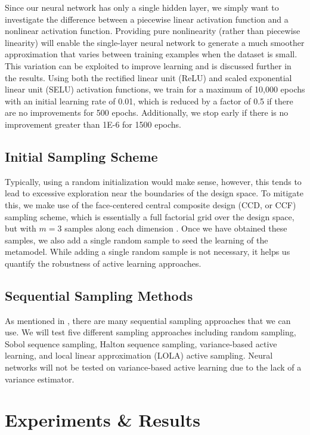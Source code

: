 \documentclass[conference,final]{IEEEtran}
\begin{document}
	Since our neural network has only a single hidden layer, we simply want to investigate the difference between a piecewise linear activation function and a nonlinear activation function. Providing pure nonlinearity (rather than piecewise linearity) will enable the single-layer neural network to generate a much smoother approximation that varies between training examples when the dataset is small. This variation can be exploited to improve learning and is discussed further in the results. Using both the rectified linear unit (ReLU) and scaled exponential linear unit (SELU) activation functions, we train for a maximum of 10,000 epochs with an initial learning rate of 0.01, which is reduced by a factor of 0.5 if there are no improvements for 500 epochs. Additionally, we stop early if there is no improvement greater than 1E-6 for 1500 epochs.
	
	\subsection{Initial Sampling Scheme}
	
	Typically, using a random initialization would make sense, however, this tends to lead to excessive exploration near the boundaries of the design space. To mitigate this, we make use of the face-centered central composite design (CCD, or CCF) sampling scheme, which is essentially a full factorial grid over the design space, but with $m=3$ samples along each dimension \cite{CentralCCD}. Once we have obtained these samples, we also add a single random sample to seed the learning of the metamodel. While adding a single random sample is not necessary, it helps us quantify the robustness of active learning approaches.
	
	\subsection{Sequential Sampling Methods}
	
	As mentioned in , there are many sequential sampling approaches that we can use. We will test five different sampling approaches including random sampling, Sobol sequence sampling, Halton sequence sampling, variance-based active learning, and local linear approximation (LOLA) active sampling. Neural networks will not be tested on variance-based active learning due to the lack of a variance estimator.
	    
	\section{Experiments \& Results}
	\label{sec:experiments-results}
	
\end{document}
